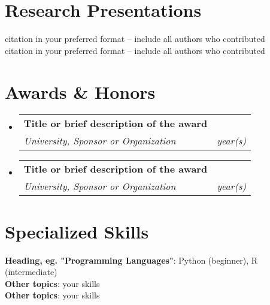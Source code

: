 \documentclass[a4paper,11pt]{article}
\makeatletter
\newcommand{\resumeSubheading}[4]{
  \vspace{-2pt}\item
    \begin{tabular*}{0.97\textwidth}[t]{l@{\extracolsep{\fill}}r}
      \textbf{#1} & #2 \\
      \textit{\small #3} & \textit{\small #4} \\
    \end{tabular*}\vspace{-10pt}
}
\newcommand{\resumeSubHeadingListStart}{\begin{itemize}[leftmargin=0.15in, label={}]}
\newcommand{\resumeSubHeadingListEnd}{\end{itemize}}
\makeatother
\begin{document}
\section{Research Presentations}
\begin{itemize}[leftmargin=0.15in, label={}]
    \normalsize{\item{
    {citation in your preferred format -- include all authors who contributed}{} \\
    {citation in your preferred format -- include all authors who contributed}{}
    }}
\end{itemize}

\section{Awards \& Honors}
\resumeSubHeadingListStart
\resumeSubheading
{Title or brief description of the award}{}
{University, Sponsor or Organization}{year(s)}
\resumeSubheading
{Title or brief description of the award}{}
{University, Sponsor or Organization}{year(s)}
\resumeSubHeadingListEnd

\section{Specialized Skills}
\begin{itemize}[leftmargin=0.15in, label={}]
    \normalsize{\item{
                    \textbf{Heading, eg. "Programming Languages"}{: Python (beginner), R (intermediate)} \\
                    \textbf{Other topics}{: your skills}\\
                    \textbf{Other topics}{: your skills} \\
              }}
\end{itemize}
\end{document}
